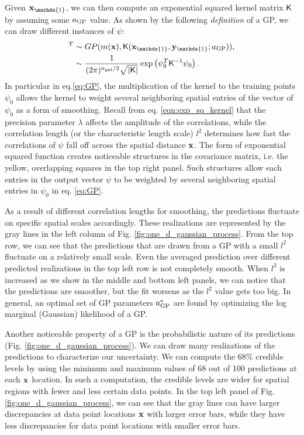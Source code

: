 Given $\xv_\mathds{1}$, we can then compute an exponential squared kernel matrix $\mathsf{K}$ 
by assuming some $a_{\rm GP}$ value.
As shown by the following {\it definition} of a GP, we can draw different instances of
$\psi$: 
\begin{align}
	[\psi_1, \psi_2, \ldots, \psi_m ]^T &\sim GP(m(\xv),
	\kerngp(\xv_{\mathds{1}}, \yv_{\mathds{1}}; \gpparams)),\\
	&\sim \frac{1}{ (2\pi)^{\ngal / 2}\sqrt{ |\kerngp|}}
	\exp\left( \psi_0^T \kerngp^{-1} \psi_0 \right).\label{eq:GP}
\end{align}
In particular in eq.\ref{eq:GP}, the multiplication of the kernel to
the training points $\psi_0$ allows the kernel to weight several neighboring
spatial entries of the vector of $\psi_0$ as a form of smoothing. 
Recall from eq. \ref{eqn:exp_sq_kernel} that 
the precision parameter $\lambda$ affects the 
amplitude of the correlations, while the correlation length (or
the characteristic length scale) $l^2$ 
determines how fast the correlations of  $\psi$ 
fall off across the spatial distance $\mathbf{x}$. 
The form of exponential squared function creates noticeable structures in the covariance matrix, i.e. the yellow,
overlapping squares in the top right panel. 
Such structures allow each entries in the output vector $\psi$ to be weighted by
several neighboring spatial entries in $\psi_0$ in eq. \ref{eq:GP}.

As a result of different correlation lengths for smoothing, 
the predictions fluctuate on specific spatial scales accordingly.
These realizations are represented by the gray lines in the left column of Fig.
\ref{fig:one_d_gaussian_process}. From the top row, we can see that 
the predictions that are drawn from a GP with a small $l^2$ 
fluctuate on a relatively small scale. Even the averaged prediction over
different predicted realizations in the top
left row is not completely smooth. When $l^2$ is increased as we show in the
middle and bottom left panels, we can notice that the predictions are
smoother, but the fit worsens as the $l^2$ value gets too big. In general,  
an optimal set of GP parameters $a_{\rm GP}^*$ are found by optimizing the log
marginal (Gaussian) likelihood of a GP.

Another noticeable property of a GP is the probabilistic nature of its predictions
(Fig. \ref{fig:one_d_gaussian_process}).
We can draw many realizations of the predictions to characterize our uncertainty. 
We can compute the 68\% credible levels
by using the minimum and maximum values of 68 out of 100 predictions at each
$\mathbf{x}$ location.
In such a computation, the credible levels are wider for spatial regions 
with fewer and less certain data points. In the top left panel of Fig.
\ref{fig:one_d_gaussian_process}, we can see that the gray lines can have
larger discrepancies at data point locations $\mathbf{x}$ with larger error bars, while they
have less discrepancies for data point locations with smaller error bars.


